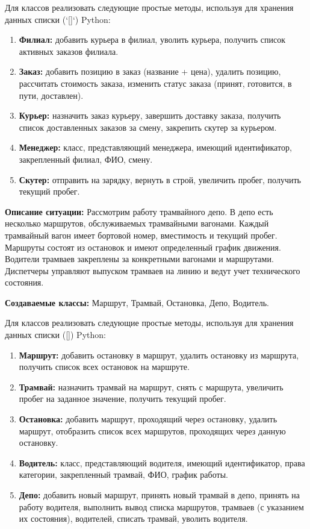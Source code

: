 \begin{enumerate}
Для классов реализовать следующие простые методы, используя для хранения данных списки (`[]`) Python:
\begin{enumerate}
    \item \textbf{Филиал:} добавить курьера в филиал, уволить курьера, получить список активных заказов филиала.
    \item \textbf{Заказ:} добавить позицию в заказ (название + цена), удалить позицию, рассчитать стоимость заказа, изменить статус заказа (принят, готовится, в пути, доставлен).
    \item \textbf{Курьер:} назначить заказ курьеру, завершить доставку заказа, получить список доставленных заказов за смену, закрепить скутер за курьером.
    \item \textbf{Менеджер:} класс, представляющий менеджера, имеющий идентификатор, закрепленный филиал, ФИО, смену.
    \item \textbf{Скутер:} отправить на зарядку, вернуть в строй, увеличить пробег, получить текущий пробег.
\end{enumerate}

\textbf{Описание ситуации:}
Рассмотрим работу трамвайного депо. В депо есть несколько маршрутов, обслуживаемых трамвайными вагонами. Каждый трамвайный вагон имеет бортовой номер, вместимость и текущий пробег. Маршруты состоят из остановок и имеют определенный график движения. Водители трамваев закреплены за конкретными вагонами и маршрутами. Диспетчеры управляют выпуском трамваев на линию и ведут учет технического состояния.

\textbf{Создаваемые классы:} Маршрут, Трамвай, Остановка, Депо, Водитель.

Для классов реализовать следующие простые методы, используя для хранения данных списки ([]) Python:
\begin{enumerate}
\item \textbf{Маршрут:} добавить остановку в маршрут, удалить остановку из маршрута, получить список всех остановок на маршруте.
\item \textbf{Трамвай:} назначить трамвай на маршрут, снять с маршрута, увеличить пробег на заданное значение, получить текущий пробег.
\item \textbf{Остановка:} добавить маршрут, проходящий через остановку, удалить маршрут, отобразить список всех маршрутов, проходящих через данную остановку.
\item \textbf{Водитель:} класс, представляющий водителя, имеющий идентификатор, права категории, закрепленный трамвай, ФИО, график работы.
\item \textbf{Депо:} добавить новый маршрут, принять новый трамвай в депо, принять на работу водителя, выполнить вывод списка маршрутов, трамваев (с указанием их состояния), водителей, списать трамвай, уволить водителя.
\end{enumerate}


\end{enumerate}
